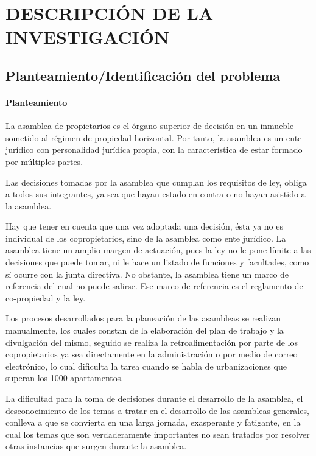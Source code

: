 \chapter{DESCRIPCIÓN DE LA INVESTIGACIÓN}
\section{Planteamiento/Identificación del problema}

\subsubsection{Planteamiento}

La asamblea de propietarios es el órgano superior de decisión en un inmueble sometido al régimen de propiedad horizontal. Por tanto, la asamblea es un ente jurídico con personalidad jurídica propia, con la característica de estar formado por múltiples partes.

Las decisiones tomadas por la asamblea que cumplan los requisitos de ley, obliga a todos sus integrantes, ya sea que hayan estado en contra o no hayan asistido a la asamblea.

Hay que tener en cuenta que una vez adoptada una decisión, ésta ya no es individual de los copropietarios, sino de la asamblea como ente jurídico. La asamblea tiene un amplio margen de actuación, pues la ley no le pone límite a las decisiones que puede tomar, ni le hace un listado de funciones y facultades, como sí ocurre con la junta directiva. No obstante, la asamblea tiene un marco de referencia del cual no puede salirse. Ese marco de referencia es el reglamento de co-propiedad y la ley. 

Los procesos desarrollados para la planeación de las asambleas se realizan manualmente, los cuales constan de la elaboración del plan de trabajo y la divulgación del mismo, seguido se realiza la retroalimentación por parte de los copropietarios ya sea directamente en la administración o por medio de correo electrónico, lo cual dificulta la tarea cuando se habla de urbanizaciones que superan los 1000 apartamentos.

La dificultad para la toma de decisiones durante el desarrollo de la asamblea, el desconocimiento de los temas a tratar en el desarrollo de las asambleas generales, conlleva a que se convierta en una larga jornada, exasperante y fatigante, en la cual los temas que son verdaderamente importantes no sean tratados por resolver otras instancias que surgen durante la asamblea.

